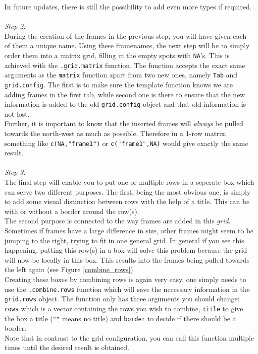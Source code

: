 \documentclass[a4paper]{article}\usepackage[]{graphicx}\usepackage[]{color}
\begin{document}
\noindent In future updates, there is still the possibility to add even more
types if required.
\\ \\
{\it Step 2:}\\
During the creation of the frames in the previous step, you will have given each
of them a unique name. Using these framenames, the next step will be to simply
order them into a matrix grid, filling in the empty spots with \verb|NA|'s.
This is achieved with the \verb|.grid.matrix| function. The function accepts
the exact same arguments as the \verb|matrix| function apart from two new ones,
namely \verb|Tab| and \verb|grid.config|. The first is to make sure the
template function knows we are adding frames in the first tab, while second one
is there to ensure that the new information is added to the old
\verb|grid.config| object and that old information is not lost.\\
Further, it is important to know that the inserted frames will {\it always} be
pulled towards the north-west as much as possible. Therefore in a 1-row
matrix, something like \verb|c(NA,"frame1")| or \verb|c("frame1",NA)| would give
exactly the same result.
\\ \\
{\it Step 3:}\\
The final step will enable you to put one or multiple rows in a seperate box
which can serve two different purposes. The first, being the most obvious one, is
simply to add some visual distinction between rows with the help of a title.
This can be with or without a border around the row(s).\\
The second purpose is connected to the way frames are added in this {\it grid}.
Sometimes if frames have a large difference in size, other frames might seem to
be jumping to the right, trying to fit in one general grid. In general if you
see this happening, putting this row(s) in a box will solve this problem because the grid will now be locally in this box.
This results into the frames being pulled towards the left again (see Figure \ref{combine_rows}).\\
Creating these boxes by combining rows is again very easy, one simply needs to
use the \verb|.combine.rows| function which will save the necessary information
in the \verb|grid.rows| object. The function only has three arguments you should
change: \verb|rows| which is a vector containing the rows you wish to
combine, \verb|title| to give the box a title (\verb|""| means no title) and
\verb|border| to decide if there should be a border.\\
Note that in contrast to the grid configuration, you can call this function
multiple times until the desired result is obtained.
\end{document}
